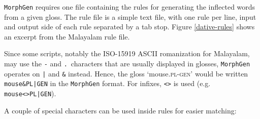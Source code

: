 \documentclass[a4paper]{article}
\newcommand{\typ}[1]{\texttt{#1}}
\newcommand{\afx}[1]{\textsc{#1}}
\begin{document}
\typ{MorphGen} requires one file containing the rules for generating the inflected words from a given gloss. The rule file is a simple text file, with one rule per line, input and output side of each rule separated by a tab stop. Figure \ref{dative-rules} shows an excerpt from the Malayalam rule file.

Since some scripts, notably the ISO-15919 ASCII romanization for Malayalam, may use the \typ{-} and \typ{.}\ characters that are usually displayed in glosses, \typ{MorphGen} operates on \typ{|} and \typ{\&} instead. Hence, the gloss `mouse.\afx{pl}-\afx{gen}' would be written \typ{mouse\&PL|GEN} in the \typ{MorphGen} format. For infixes, \typ{<>} is used (e.g. \typ{mouse<>PL|GEN}).

A couple of special characters can be used inside rules for easier matching:
\end{document}
